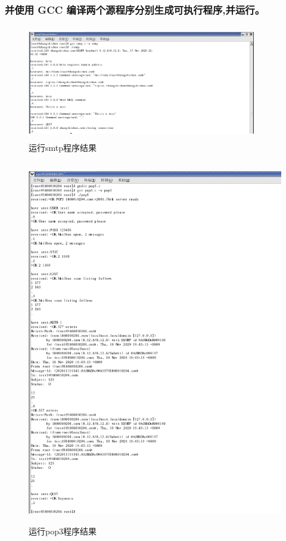 \documentclass{article}
\begin{document}
\subsubsection{并使用 GCC 编译两个源程序分别生成可执行程序,并运行。}
\begin{figure}[h]
    \centering
    \includegraphics[width=10cm,height=5cm]{12.png}
    \caption{运行smtp程序结果}
\end{figure}
\begin{figure}[h]
    \centering
    \includegraphics[width=14cm,height=16cm]{15.png}
    \caption{运行pop3程序结果}
\end{figure}
\newpage
\end{document}
